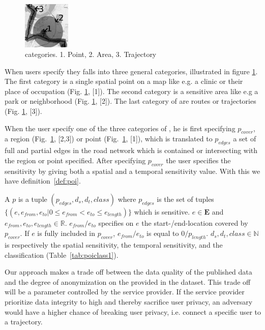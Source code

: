 \begin{figure}
  \center
	\includegraphics[width=0.2\textwidth]{figures/poitypes.jpeg}
	\caption{\poi categories. 1. Point, 2. Area, 3. Trajectory}
  \label{fig:poiCategories}
\end{figure}


When users specify \pois they falls into three general categories, illustrated in figure \ref{fig:poiCategories}. The first category is a single spatial point on a map like e.g. a clinic or their place of occupation (Fig. \ref{fig:poiCategories}, [1]). The second category \pois is a sensitive area like e.g a park or neighborhood (Fig. \ref{fig:poiCategories}, [2]). The last category of \pois are routes or trajectories (Fig. \ref{fig:poiCategories}, [3]). 

When the user specify one of the three categories of \poisns, he is first specifying $p_{cover}$, a region (Fig.~\ref{fig:poiCategories}, [2,3]) or point (Fig.~\ref{fig:poiCategories}, [1]), which is translated to $p_{edges}$ a set of full and partial edges in the road network which is contained or intersecting with the region or point specified. After specifying $p_{cover}$ the user specifies the sensitivity by giving both a spatial and a temporal sensitivity value. With this we have definition~\ref{def:poi}.

\begin{deff}[\poins] \label{def:poi}
A \poi $p$ is a tuple $(p_{edges}, d_s, d_t, class)$ where $p_{edges}$ is the set of tuples $\{(e, e_{from}, e_{to} | 0 \leq e_{from} < e_{to} \leq e_{length})\}$ which is sensitive. 
$e \in \mathbf{E}$ and $e_{from}, e_{to}, e_{length} \in \mathbb{R}$. 
$e_{from}/e_{to}$ specifies on $e$ the start-/end-location covered by $p_{cover}$. If $e$ is fully included in $p_{cover}$, $e_{from}/e_{to}$ is equal to $0/p_{length}$.
$d_s, d_t, class \in \mathbb{N}$ is respectively the spatial sensitivity, the temporal sensitivity, and the \poi classification (Table~\ref{tab:poiclass1}).
\end{deff}

Our approach makes a trade off between the data quality of the published data and the degree of anonymization on the provided in the dataset. This trade off will be a parameter controlled by the service provider. If the service provider prioritize data integrity to high and thereby sacrifice user privacy, an adversary would have a higher chance of breaking user privacy, i.e. connect a specific user to a trajectory.

